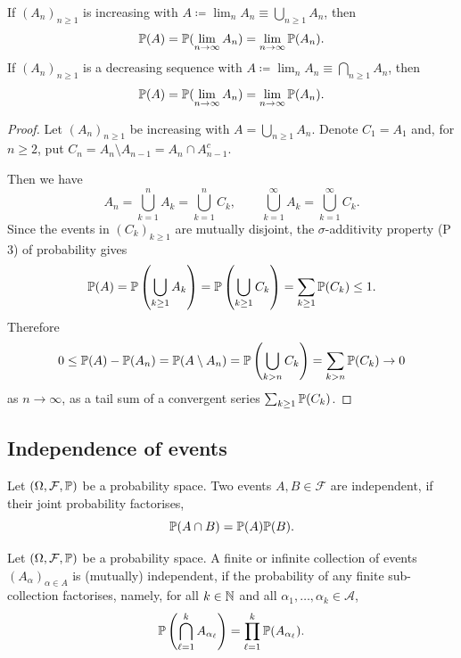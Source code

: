 \documentclass[10pt, a4paper]{article}
\begin{document}
\begin{lemma}
    If $(A_n)_{n \geq 1}$ is increasing with $A \coloneqq \lim_{n}A_n \equiv \bigcup_{n \geq 1}A_n$,
    then
    \[
    \P(A) = \P(\lim_{n \to \infty}A_n) = \lim_{n \to \infty}\P(A_n).
    \]
    If $(A_n)_{n \geq 1}$ is a decreasing sequence with $A \coloneqq \lim_{n}A_n \equiv \bigcap_{n \geq 1}A_n$,
    then
    \[
    \P(A) = \P(\lim_{n \to \infty}A_n) = \lim_{n \to \infty}\P(A_n).
    \]

    \begin{proof}
        Let $(A_n)_{n \geq 1}$ be increasing with $A = \bigcup_{n \geq 1}A_n$.
        Denote $C_1 = A_1$ and,
        for $n \geq 2$,
        put $C_n = A_n \setminus A_{n - 1} = A_n \cap A_{n - 1}^{c}$.

        Then we have
        \[
        A_n = \bigcup_{k = 1}^{n}A_k = \bigcup_{k = 1}^{n}C_k,\qquad\bigcup_{k = 1}^{\infty}A_k = \bigcup_{k = 1}^{\infty}C_k.
        \]
        Since the events in $(C_k)_{k \geq 1}$ are mutually disjoint,
        the $\sigma$-additivity property
        (P$3$)
        of probability gives
        \[
        \P(A) = \P\left(\bigcup_{k \geq 1}A_k\right) = \P\left(\bigcup_{k \geq 1}C_k\right) = \sum_{k \geq 1}\P(C_k) \leq 1.
        \]
        Therefore
        \[
        0 \leq \P(A) - \P(A_n) = \P(A \setminus A_n) = \P\left(\bigcup_{k > n}C_k\right) = \sum_{k > n}\P(C_k) \to 0
        \]
        as $n \to \infty$,
        as a tail sum of a convergent series $\sum_{k \geq 1}\P(C_k)$.
    \end{proof}
\end{lemma}

\subsection{Independence of events}

\begin{definition}
    Let $(\Omega, \mathcal{F}, \P)$ be a probability space.
    Two events $A, B \in \mathcal{F}$ are independent,
    if their joint probability factorises,
    \[
    \P(A \cap B) = \P(A)\P(B).
    \]
\end{definition}

\begin{definition}
    Let $(\Omega, \mathcal{F}, \P)$ be a probability space.
    A finite or infinite collection of events $(A_{\alpha})_{\alpha \in A}$ is
    (mutually)
    independent,
    if the probability of any finite sub-collection factorises,
    namely,
    for all $k \in \N$ and all $\alpha_1, \dotsc, \alpha_k \in \mathcal{A}$,
    \[
    \P\left(\bigcap_{\ell = 1}^{k}A_{\alpha_{\ell}}\right) = \prod_{\ell = 1}^{k}\P(A_{\alpha_{\ell}}).
    \]
\end{definition}
\end{document}
